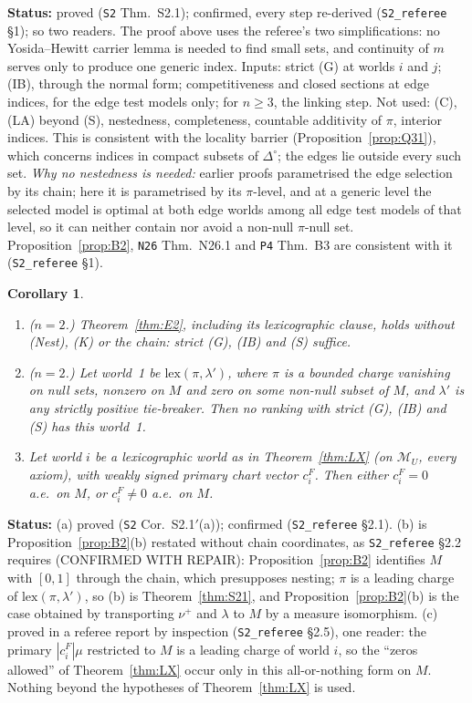 \documentclass[11pt]{article}
\newtheorem{corollary}[theorem]{Corollary}
\theoremstyle{definition}
\theoremstyle{remark}
\newcommand{\Di}{\Delta^{\circ}}
\newcommand{\M}{\mathcal M}
\newcommand{\src}[1]{\texttt{#1}}
\newcommand{\status}[1]{\par\smallskip\noindent\textbf{Status:} #1\par\smallskip}
\begin{document}
\status{proved (\src{S2} Thm.~S2.1); confirmed, every step re-derived (\src{S2\_referee} \S1); so two readers. The proof above uses the referee's two simplifications: no Yosida--Hewitt carrier lemma is needed to find small sets, and continuity of $m$ serves only to produce one generic index. Inputs: strict (G) at worlds $i$ and $j$; (IB), through the normal form; competitiveness and closed sections at edge indices, for the edge test models only; for $n\ge3$, the linking step. Not used: (C), (LA) beyond (S), nestedness, completeness, countable additivity of $\pi$, interior indices. This is consistent with the locality barrier (Proposition~\ref{prop:Q31}), which concerns indices in compact subsets of $\Di$; the edges lie outside every such set. \emph{Why no nestedness is needed:} earlier proofs parametrised the edge selection by its chain; here it is parametrised by its $\pi$-level, and at a generic level the selected model is optimal at both edge worlds among all edge test models of that level, so it can neither contain nor avoid a non-null $\pi$-null set. Proposition~\ref{prop:B2}, \src{N26} Thm.~N26.1 and \src{P4} Thm.~B3 are consistent with it (\src{S2\_referee} \S1).}

\begin{corollary}\label{cor:S21}
\begin{enumerate}[leftmargin=*,label=(\alph*)]
\item ($n=2$.) Theorem~\ref{thm:E2}, including its lexicographic clause, holds without (Nest), (K) or the chain: strict (G), (IB) and (S) suffice.
\item ($n=2$.) Let world~1 be $\mathrm{lex}(\pi,\lambda')$, where $\pi$ is a bounded charge vanishing on null sets, nonzero on $M$ and zero on some non-null subset of $M$, and $\lambda'$ is any strictly positive tie-breaker. Then no ranking with strict (G), (IB) and (S) has this world~1.
\item Let world $i$ be a lexicographic world as in Theorem~\ref{thm:LX} (on $\M_U$, every axiom), with weakly signed primary chart vector $c^F_i$. Then either $c^F_i=0$ a.e.\ on $M$, or $c^F_i\ne0$ a.e.\ on $M$.
\end{enumerate}
\end{corollary}
\status{(a) proved (\src{S2} Cor.~S2.1$'$(a)); confirmed (\src{S2\_referee} \S2.1). (b) is Proposition~\ref{prop:B2}(b) restated without chain coordinates, as \src{S2\_referee} \S2.2 requires (CONFIRMED WITH REPAIR): Proposition~\ref{prop:B2} identifies $M$ with $[0,1]$ through the chain, which presupposes nesting; $\pi$ is a leading charge of $\mathrm{lex}(\pi,\lambda')$, so (b) is Theorem~\ref{thm:S21}, and Proposition~\ref{prop:B2}(b) is the case obtained by transporting $\nu^+$ and $\lambda$ to $M$ by a measure isomorphism. (c) proved in a referee report by inspection (\src{S2\_referee} \S2.5), one reader: the primary $|c^F_i|\mu$ restricted to $M$ is a leading charge of world $i$, so the ``zeros allowed'' of Theorem~\ref{thm:LX} occur only in this all-or-nothing form on $M$. Nothing beyond the hypotheses of Theorem~\ref{thm:LX} is used.}
\end{document}
